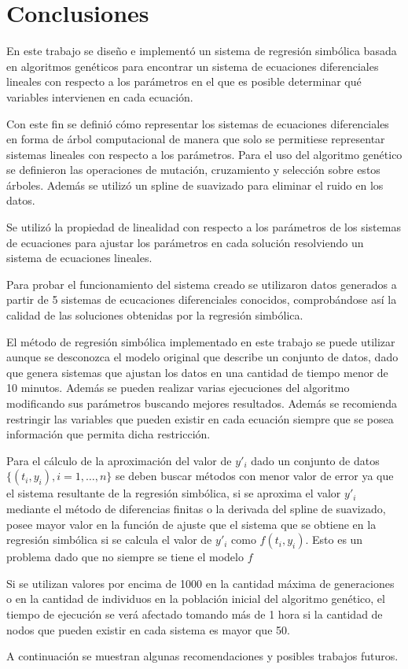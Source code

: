 \chapter*{Conclusiones}\label{chapter:conclusions}

En este trabajo se diseño e implementó un sistema de regresión simbólica basada en algoritmos genéticos para encontrar un sistema de ecuaciones diferenciales lineales con respecto a los parámetros en el que es posible determinar qué variables intervienen en cada ecuación.

Con este fin se definió cómo representar los sistemas de ecuaciones diferenciales en forma de árbol computacional de manera que solo se permitiese representar sistemas lineales con respecto a los parámetros. Para el uso del algoritmo genético se definieron las operaciones de mutación, cruzamiento y selección sobre estos árboles. Además se utilizó un spline de suavizado para eliminar el ruido en los datos.

Se utilizó la propiedad de linealidad con respecto a los parámetros de los sistemas de ecuaciones para ajustar los parámetros en cada solución resolviendo un sistema de ecuaciones lineales.

Para probar el funcionamiento del sistema creado se utilizaron datos generados a partir de 5 sistemas de ecucaciones diferenciales conocidos, comprobándose así la calidad de las soluciones obtenidas por la regresión simbólica.

El método de regresión simbólica implementado en este trabajo se puede utilizar aunque se desconozca el modelo original que describe un conjunto de datos, dado que genera sistemas que ajustan los datos en una cantidad de tiempo menor de 10 minutos. Además se pueden realizar varias ejecuciones del algoritmo modificando sus parámetros buscando mejores resultados. Además se recomienda restringir las variables que pueden existir en cada ecuación siempre que se posea información que permita dicha restricción.

Para el cálculo de la aproximación del valor de $y'_i$ dado un conjunto de datos $\{(t_i, y_i), i=1, \dots, n\}$ se deben buscar métodos con menor valor de error ya que el sistema resultante de la regresión simbólica, si se aproxima el valor $y'_i$ mediante el método de diferencias finitas o la derivada del spline de suavizado, posee mayor valor en la función de ajuste que el sistema que se obtiene en la regresión simbólica si se calcula el valor de $y'_i$ como $f(t_i, y_i)$. Esto es un problema dado que no siempre se tiene el modelo $f$

Si se utilizan valores por encima de 1000 en la cantidad máxima de generaciones o en la cantidad de individuos en la población inicial del algoritmo genético, el tiempo de ejecución se verá afectado tomando más de 1 hora si la cantidad de nodos que pueden existir en cada sistema es mayor que 50.

A continuación se muestran algunas recomendaciones y posibles trabajos futuros.